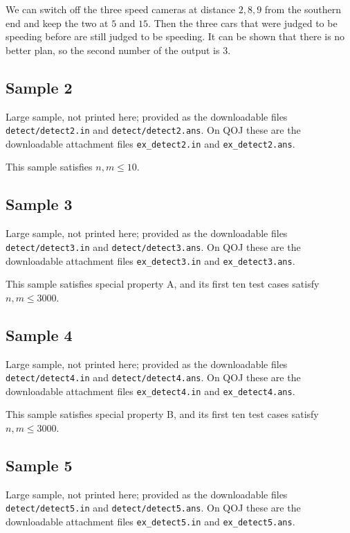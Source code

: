 \documentclass[11pt]{article}
\begin{document}
We can switch off the three speed cameras at distance $2, 8, 9$ from the
southern end and keep the two at $5$ and $15$.
Then the three cars that were judged to be speeding before are still judged
to be speeding.
It can be shown that there is no better plan, so the second number of the
output is $3$.

\subsection*{Sample 2}

Large sample, not printed here;
provided as the downloadable files \texttt{detect/detect2.in} and \texttt{detect/detect2.ans}.
On QOJ these are the downloadable attachment files
\texttt{ex\_detect2.in} and \texttt{ex\_detect2.ans}.

This sample satisfies $n, m \le 10$.

\subsection*{Sample 3}

Large sample, not printed here;
provided as the downloadable files \texttt{detect/detect3.in} and \texttt{detect/detect3.ans}.
On QOJ these are the downloadable attachment files
\texttt{ex\_detect3.in} and \texttt{ex\_detect3.ans}.

This sample satisfies special property A, and its first ten test cases
satisfy $n, m \le 3000$.

\subsection*{Sample 4}

Large sample, not printed here;
provided as the downloadable files \texttt{detect/detect4.in} and \texttt{detect/detect4.ans}.
On QOJ these are the downloadable attachment files
\texttt{ex\_detect4.in} and \texttt{ex\_detect4.ans}.

This sample satisfies special property B, and its first ten test cases
satisfy $n, m \le 3000$.

\subsection*{Sample 5}

Large sample, not printed here;
provided as the downloadable files \texttt{detect/detect5.in} and \texttt{detect/detect5.ans}.
On QOJ these are the downloadable attachment files
\texttt{ex\_detect5.in} and \texttt{ex\_detect5.ans}.
\end{document}
